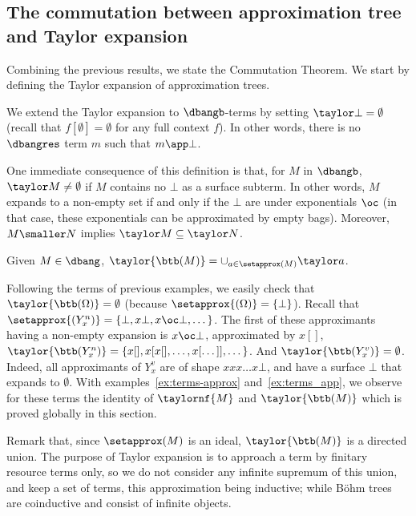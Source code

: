 \subsection{The commutation between approximation tree and Taylor expansion}
\label{subsec:bang:commutation}
Combining the previous results, we state the Commutation Theorem. We start by defining the Taylor expansion of approximation trees.

\begin{definition}\label{def:taylor-dbangb}
We extend the Taylor expansion to $\dbangb$-terms by setting
	$\taylor \bot=\emptyset$ (recall that $f[\emptyset]=\emptyset$ for any
	full context $f$). In other words, there is no $\dbangres$ term $m$ such
	that $m\app \bot$.
\end{definition}

One immediate consequence of this definition is that, for $M$ in $\dbangb$, $\taylor
M\neq\emptyset$ if $M$ contains no $\bot$ as a surface subterm. In other words, $M$
expands to a non-empty set if and only if the $\bot$ are under exponentials
$\oc$ (in that case, these exponentials can be approximated by empty bags).
Moreover, $M\smaller N$ implies $\taylor M\subseteq \taylor N$.


\begin{definition}\label{def:taylor_bohm}
	Given $M\in \dbang$, $\taylor{\btb(M)}=\cup_{a\in\setapprox(M)}\taylor a$.
\end{definition}

\begin{example}\label{ex:bt-taylor}
	Following the terms of previous examples, we easily check that
	$\taylor{\btb(\Omega)}=\emptyset$ (because
	$\setapprox{(\Omega)}=\{\bot\}$).
	Recall that $\setapprox{(Y^n_x)}=\{\bot,x\bot,x\oc\bot,\dots \}$. The first of
	these approximants having a non-empty expansion is $x\oc\bot$,
	approximated by $x[]$, 
	$\taylor{\btb(Y^n_x)}=\{x[],x[x[],\dots ,x[\dots ]],\dots \}$.
	And
	$\taylor{\btb(Y^v_x)}=\emptyset$. Indeed, all approximants of $Y^v_x$ are
	of shape $xxx\dots x\bot$, and have a surface $\bot$ that expands to
	$\emptyset$.
	With examples~\ref{ex:terms-approx}
	and~\ref{ex:terms_app}, we observe for these terms the identity of $\taylornf{M}$ and
	$\taylor{\btb(M)}$ which is proved globally in this section.
\end{example}
Remark that, since $\setapprox(M)$ is an ideal, $\taylor{\btb (M)}$ is a directed
union. The purpose of Taylor expansion is to approach a term by finitary resource
terms only, so we do not consider any infinite supremum of this union, and keep
a set of terms, this approximation being inductive; while Böhm trees are
coinductive and consist of infinite objects.


